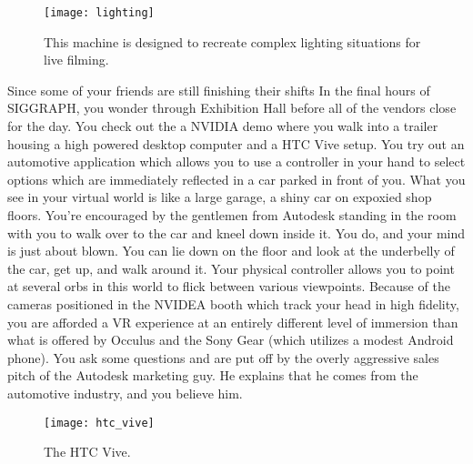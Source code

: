 \documentclass[../main.tex]{subfiles}
\begin{document}
\begin{figure}[h!]
	\centering
	\texttt{[image: lighting]}
	\caption*{This machine is designed to recreate complex lighting situations for live filming.}
\end{figure}


Since some of your friends are still finishing their shifts In the final hours of SIGGRAPH, you wonder through Exhibition Hall before all of the vendors close for the day. You check out the a NVIDIA demo where you walk into a trailer housing a high powered desktop computer and a HTC Vive setup. You try out an automotive application which allows you to use a controller in your hand to select options which are immediately reflected in a car parked in front of you. What you see in your virtual world is like a large garage, a shiny car on expoxied shop floors. You're encouraged by the gentlemen from Autodesk standing in the room with you to walk over to the car and kneel down inside it. You do, and your mind is just about blown. You can lie down on the floor and look at the underbelly of the car, get up, and walk around it. Your physical controller allows you to point at several orbs in this world to flick between various viewpoints. Because of the cameras positioned in the NVIDEA booth which track your head in high fidelity, you are afforded a VR experience at an entirely different level of immersion than what is offered by Occulus and the Sony Gear (which utilizes a modest Android phone). You ask some questions and are put off by the overly aggressive sales pitch of the Autodesk marketing guy. He explains that he comes from the automotive industry, and you believe him.

\begin{figure}[h!]
	\centering
	\texttt{[image: htc\_vive]}
	\caption*{The HTC Vive.}
\end{figure}
\end{document}
